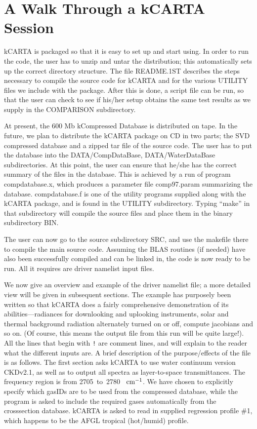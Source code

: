 \documentclass[12pt]{article}
\newcommand{\kc}{\textsf{kCARTA}\xspace}
\newcommand{\cm}{\hbox{cm}}
\begin{document}
\section{A Walk Through a \kc Session}

\kc is packaged so that it is easy to set up and start using.  In
order to run the code, the user has to unzip and untar the
distribution; this automatically sets up the correct directory
structure.  The file {\sf README.1ST} describes the steps necessary
to compile the source code for \kc and for the various {\sf UTILITY}
files we include with the package.  After this is done, a script
file can be run, so that the user can check to see if his/her setup
obtains the same test results as we supply in the {\sf COMPARISON}
subdirectory.

At present, the 600 Mb kCompressed Database is distributed on tape.
In the future, we plan to distribute the \kc package on CD in two
parts; the {\sf SVD} compressed database and a zipped tar file of
the source code.  The user has to put the database into the {\sf
DATA/CompDataBase}, {\sf DATA/WaterDataBase} subdirectories.  At
this point, the user can ensure that he/she has the correct summary
of the files in the database.  This is achieved by a run of program
{\sf compdatabase.x}, which produces a parameter file {\sf
comp97.param} summarizing the database.  {\sf compdatabase.f} is one
of the utility programs supplied along with the \kc package, and is
found in the {\sf UTILITY} subdirectory.  Typing ``make'' in that
subdirectory will compile the source files and place them in the
binary subdirectory {\sf BIN}.

The user can now go to the source subdirectory {\sf SRC}, and use
the {\sf makefile} there to compile the main source code.  Assuming
the {\sf BLAS} routines (if needed) have also been
successfully compiled and can be linked in, the code is now ready to
be run.  All it requires are driver namelist input files.

We now give an overview and example of the driver namelist file; a more
detailed view will be given in subsequent sections.  The example has
purposely been written so that \kc does a fairly comprehensive
demonstration of its abilities---radiances for downlooking and
uplooking instruments, solar and thermal background radiation
alternately turned on or off, compute jacobians and so on.  (Of
course, this means the output file from this run will be quite
large!).  All the lines that begin with {\tt !} are comment lines,
and will explain to the reader what the different inputs are.  A
brief description of the purpose/effects of the file is as follows.
The first section asks \kc to use water continuum version CKDv2.1,
as well as to output all spectra as layer-to-space transmittances.
The frequency region is from 2705~to~2780~ $\cm^{-1}$.  We have
chosen to explicitly specify which gasIDs are to be used from the
compressed database, while the program is asked to include the
required gases automatically from the crosssection database.  \kc is
asked to read in supplied regression profile \#1, which happens to
be the {\sf AFGL} tropical (hot/humid) profile.
\end{document}
